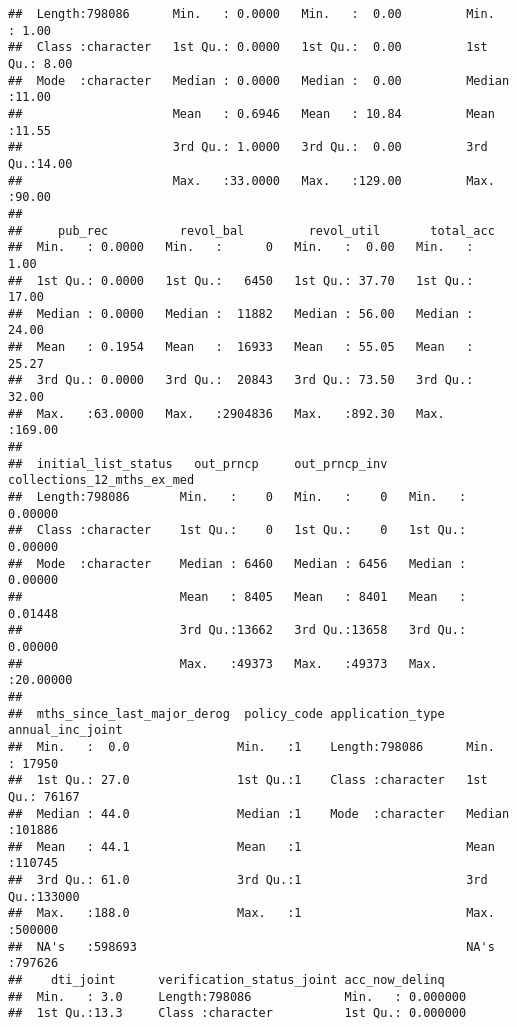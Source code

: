 \documentclass[
]{article}
\begin{document}
\begin{verbatim}
##  Length:798086      Min.   : 0.0000   Min.   :  0.00         Min.   : 1.00  
##  Class :character   1st Qu.: 0.0000   1st Qu.:  0.00         1st Qu.: 8.00  
##  Mode  :character   Median : 0.0000   Median :  0.00         Median :11.00  
##                     Mean   : 0.6946   Mean   : 10.84         Mean   :11.55  
##                     3rd Qu.: 1.0000   3rd Qu.:  0.00         3rd Qu.:14.00  
##                     Max.   :33.0000   Max.   :129.00         Max.   :90.00  
##                                                                             
##     pub_rec          revol_bal         revol_util       total_acc     
##  Min.   : 0.0000   Min.   :      0   Min.   :  0.00   Min.   :  1.00  
##  1st Qu.: 0.0000   1st Qu.:   6450   1st Qu.: 37.70   1st Qu.: 17.00  
##  Median : 0.0000   Median :  11882   Median : 56.00   Median : 24.00  
##  Mean   : 0.1954   Mean   :  16933   Mean   : 55.05   Mean   : 25.27  
##  3rd Qu.: 0.0000   3rd Qu.:  20843   3rd Qu.: 73.50   3rd Qu.: 32.00  
##  Max.   :63.0000   Max.   :2904836   Max.   :892.30   Max.   :169.00  
##                                                                       
##  initial_list_status   out_prncp     out_prncp_inv   collections_12_mths_ex_med
##  Length:798086       Min.   :    0   Min.   :    0   Min.   : 0.00000          
##  Class :character    1st Qu.:    0   1st Qu.:    0   1st Qu.: 0.00000          
##  Mode  :character    Median : 6460   Median : 6456   Median : 0.00000          
##                      Mean   : 8405   Mean   : 8401   Mean   : 0.01448          
##                      3rd Qu.:13662   3rd Qu.:13658   3rd Qu.: 0.00000          
##                      Max.   :49373   Max.   :49373   Max.   :20.00000          
##                                                                                
##  mths_since_last_major_derog  policy_code application_type   annual_inc_joint
##  Min.   :  0.0               Min.   :1    Length:798086      Min.   : 17950  
##  1st Qu.: 27.0               1st Qu.:1    Class :character   1st Qu.: 76167  
##  Median : 44.0               Median :1    Mode  :character   Median :101886  
##  Mean   : 44.1               Mean   :1                       Mean   :110745  
##  3rd Qu.: 61.0               3rd Qu.:1                       3rd Qu.:133000  
##  Max.   :188.0               Max.   :1                       Max.   :500000  
##  NA's   :598693                                              NA's   :797626  
##    dti_joint      verification_status_joint acc_now_delinq     
##  Min.   : 3.0     Length:798086             Min.   : 0.000000  
##  1st Qu.:13.3     Class :character          1st Qu.: 0.000000  

\end{verbatim}
\end{document}
